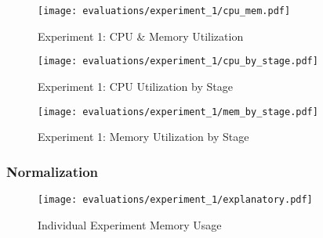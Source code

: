\begin{figure}[H]
    \begin{adjustwidth}{-0.2\paperwidth}{-0.2\paperwidth}
        \centering
        \texttt{[image: evaluations/experiment\_1/cpu\_mem.pdf]}
        \caption{Experiment 1: CPU \& Memory Utilization}
        \label{fig:eval_1_simplest_cpu_mem}
    \end{adjustwidth}
\end{figure}

\begin{figure}[p]
    \begin{adjustwidth}{-0.2\paperwidth}{-0.2\paperwidth}
        \centering
        \texttt{[image: evaluations/experiment\_1/cpu\_by\_stage.pdf]}
        \caption{Experiment 1: CPU Utilization by Stage}
        \label{fig:eval_1_simplest_cpu_boxviolin}
    \end{adjustwidth}

    \begin{adjustwidth}{-0.2\paperwidth}{-0.2\paperwidth}
        \centering
        \texttt{[image: evaluations/experiment\_1/mem\_by\_stage.pdf]}
        \caption{Experiment 1: Memory Utilization by Stage}
        \label{fig:eval_1_simplest_memory_boxviolin}
    \end{adjustwidth}
\end{figure}

\pagebreak
\subsubsection{Normalization}

\begin{figure}[h]
        \centering
        \texttt{[image: evaluations/experiment\_1/explanatory.pdf]}
        \caption{Individual Experiment Memory Usage}
        \label{fig:eval_1_simplest_explanation_shift}
\end{figure}

